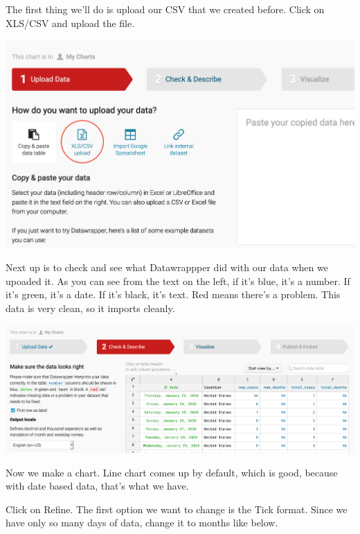 \documentclass[]{book}
\begin{document}
The first thing we'll do is upload our CSV that we created before. Click on XLS/CSV and upload the file.

\includegraphics[width=28.14in]{images/datawrapper2}

Next up is to check and see what Datawrappper did with our data when we upoaded it. As you can see from the text on the left, if it's blue, it's a number. If it's green, it's a date. If it's black, it's text. Red means there's a problem. This data is very clean, so it imports cleanly.

\includegraphics[width=43.64in]{images/datawrapper3}

Now we make a chart. Line chart comes up by default, which is good, because with date based data, that's what we have.

Click on Refine. The first option we want to change is the Tick format. Since we have only so many days of data, change it to months like below.
\end{document}
